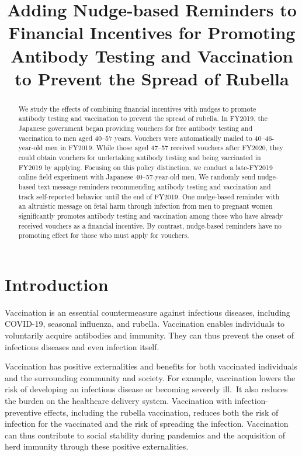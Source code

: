 \documentclass[
  11pt,
  a4paper
]{article}
\title{Adding Nudge-based Reminders to Financial Incentives for Promoting Antibody Testing and Vaccination to Prevent the Spread of Rubella}
\author{}
\date{}
\begin{document}
\maketitle
\begin{abstract}
We study the effects of combining financial incentives with nudges to promote antibody testing and vaccination to prevent the spread of rubella. In FY2019, the Japanese government began providing vouchers for free antibody testing and vaccination to men aged 40--57 years. Vouchers were automatically mailed to 40--46-year-old men in FY2019. While those aged 47--57 received vouchers after FY2020, they could obtain vouchers for undertaking antibody testing and being vaccinated in FY2019 by applying. Focusing on this policy distinction, we conduct a late-FY2019 online field experiment with Japanese 40--57-year-old men. We randomly send nudge-based text message reminders recommending antibody testing and vaccination and track self-reported behavior until the end of FY2019. One nudge-based reminder with an altruistic message on fetal harm through infection from men to pregnant women significantly promotes antibody testing and vaccination among those who have already received vouchers as a financial incentive. By contrast, nudge-based reminders have no promoting effect for those who must apply for vouchers.
\end{abstract}



\newpage

\hypertarget{intro}{%
\section{Introduction}\label{intro}}

Vaccination is an essential countermeasure against infectious diseases, including COVID-19, seasonal influenza, and rubella. Vaccination enables individuals to voluntarily acquire antibodies and immunity. They can thus prevent the onset of infectious diseases and even infection itself.

Vaccination has positive externalities and benefits for both vaccinated individuals and the surrounding community and society. For example, vaccination lowers the risk of developing an infectious disease or becoming severely ill.~It also reduces the burden on the healthcare delivery system. Vaccination with infection-preventive effects, including the rubella vaccination, reduces both the risk of infection for the vaccinated and the risk of spreading the infection. Vaccination can thus contribute to social stability during pandemics and the acquisition of herd immunity through these positive externalities.
\end{document}
